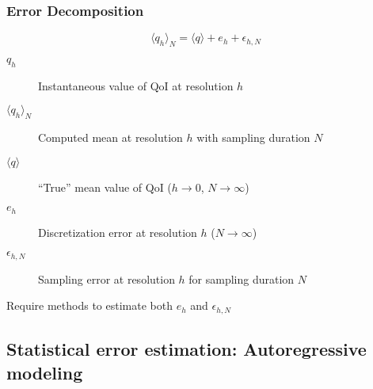 \documentclass[mathserif]{beamer}
\newcommand{\rarrow}{\rightarrow}
\begin{document}
\begin{frame}
\frametitle{Error Decomposition}

\vfill

\begin{equation*}
  \langle q_h \rangle_{N} = \langle q \rangle + e_h + \epsilon_{h,N}
\end{equation*}

\vfill

\begin{description}
\item[$q_h$] Instantaneous value of QoI at resolution $h$
\item[$\langle q_h \rangle_{N}$] Computed mean at resolution $h$ with sampling duration $N$
\item[$\langle q \rangle$] ``True'' mean value of QoI ($h \rarrow 0$, $N \rarrow \infty$)
\item[$e_h$] Discretization error at resolution $h$ ($N \rarrow \infty$)
\item[$\epsilon_{h,N}$] Sampling error at resolution $h$ for sampling duration $N$
\end{description}

\vfill

Require methods to estimate both $e_h$ and $\epsilon_{h,N}$

\vfill

\end{frame}

\subsection{Statistical error estimation: Autoregressive modeling}
\end{document}
